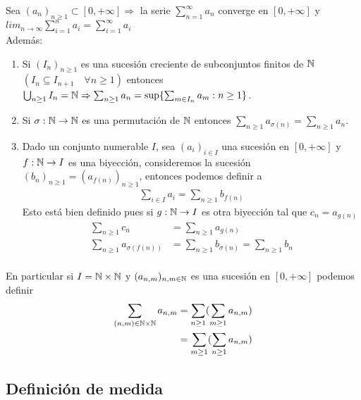 \begin{prop}
    Sea $(a_n)_{n \geq 1} \subset [0, +\infty] \Rightarrow$ la serie $\sum_{n = 1}^{\infty} a_n$ converge en $[0, +\infty]$
    y $lim_{n \to \infty} \sum_{i = 1}^{n} a_i = \sum_{i = 1}^{\infty} a_i  $ \\
    Además:
    \begin{enumerate}
        \item Si $(I_n)_{n \geq 1}$ es una sucesión creciente de subconjuntos finitos de $\mathbb{N}$ $(I_n \subseteq I_{n+1} \quad \forall n \geq 1)$ entonces
              $\bigcup_{n \geq 1} I_n = \mathbb{N} \Rightarrow \sum_{n \geq 1} a_n = \text{sup}\{ \sum_{m \in I_n} a_m : n \geq 1 \}$.
        \item Si $\sigma: \mathbb{N} \to \mathbb{N}$ es una permutación de $\mathbb{N}$ entonces $\sum_{n \geq 1} a_{\sigma(n)} = \sum_{n \geq 1} a_n$.
        \item Dado un conjunto numerable $I$, sea $(a_i)_{i \in I}$ una sucesión en $[0, +\infty]$ y $f: \mathbb{N} \to I$ es una biyección, consideremos
              la sucesión $(b_n)_{n \geq 1} = (a_{f(n)})_{n \geq 1}$, entonces podemos definir a \begin{align*}
                  \sum_{i \in I} a_i = \sum_{n \geq 1} b_{f(n)}
              \end{align*}
              Esto está bien definido pues si $g: \mathbb{N} \to I$ es otra biyección tal que $c_n = a_{g(n)}$ \begin{align*}
                  \sum_{n \geq 1} c_n              & = \sum_{n \geq 1} a_{g(n)}                            \\
                  \sum_{n \geq 1} a_{\sigma(f(n))} & = \sum_{n \geq 1} b_{\sigma(n)} = \sum_{n \geq 1} b_n \\
              \end{align*}
    \end{enumerate}

    En particular si $I = \mathbb{N} \times \mathbb{N}$ y $(a_{n, m})_{n, m \in \mathbb{N}}$ es una sucesión en $[0, +\infty]$ podemos definir \begin{align*}
        \sum_{(n, m) \in \mathbb{N} \times \mathbb{N}} a_{n, m} & = \sum_{n \geq 1}(\sum_{m \geq 1} a_{n, m}) \\
                                                & = \sum_{m \geq 1}(\sum_{n \geq 1} a_{n, m}) \\
    \end{align*}
\end{prop}

\subsection{Definición de medida}

